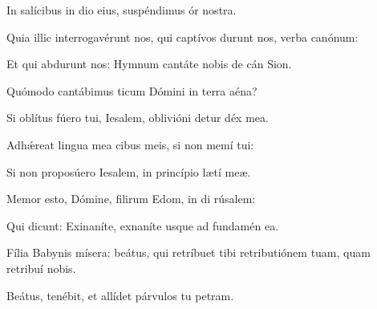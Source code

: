 \item {}

\item In salícibus in dio eius,\psstar{} suspéndimus ór nostra.

\item Quia illic interrogavérunt nos, qui captívos durunt nos,\psstar{} verba canónum:

\item Et qui abdurunt nos:\psstar{} Hymnum cantáte nobis de cán Sion.

\item Quómodo cantábimus ticum Dómini\psstar{} in terra aéna?

\item Si oblítus fúero tui, Iesalem,\psstar{} oblivióni detur déx mea.

\item Adhǽreat lingua mea cibus meis,\psstar{} si non memí tui:

\item Si non proposúero Iesalem,\psstar{} in princípio lætí meæ.

\item Memor esto, Dómine, filirum Edom,\psstar{} in di rúsalem:

\item Qui dicunt: Exinaníte, exnaníte\psstar{} usque ad fundamén  ea.

\item Fília Babynis mísera:\psstar{} beátus, qui retríbuet tibi retributiónem tuam, quam retribuí nobis.

\item Beátus,  tenébit,\psstar{} et allídet párvulos tu  petram.
